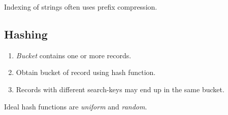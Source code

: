 \documentclass[twocolumn,english]{article}
\begin{document}
\noindent Indexing of strings often uses prefix compression.


\subsection{Hashing}
\begin{enumerate}
\item \emph{Bucket} contains one or more records.
\item Obtain bucket of record using hash function.
\item Records with different search-keys may end up in the same bucket.
\end{enumerate}
Ideal hash functions are \emph{uniform} and \emph{random}.
\end{document}
